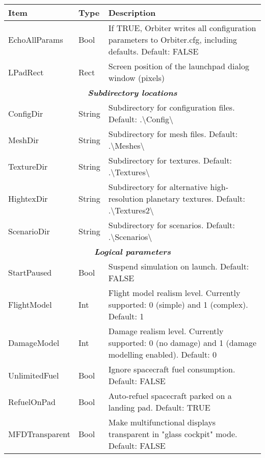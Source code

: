 \documentclass[Orbiter Developer Manual.tex]{subfiles}
\begin{document}
	\begin{longtable}{ |p{}|p{}|p{}| }
	\hline\rule{0pt}{2ex}
	\textbf{Item} & \textbf{Type} & \textbf{Description}\\
	\hline\rule{0pt}{2ex}
	EchoAllParams & Bool & If TRUE, Orbiter writes all configuration parameters to Orbiter.cfg, including defaults. Default: FALSE\\
	\hline\rule{0pt}{2ex}
	LPadRect & Rect & Screen position of the launchpad dialog window (pixels)\\
	\hline
	\multicolumn{3}{|c|}{\rule{0pt}{2ex}\textbf{\textit{Subdirectory locations}}}\\
	\hline\rule{0pt}{2ex}
	ConfigDir & String & Subdirectory for configuration files. Default: .\textbackslash Config\textbackslash\\
	\hline\rule{0pt}{2ex}
	MeshDir & String & Subdirectory for mesh files. Default: .\textbackslash Meshes\textbackslash\\
	\hline\rule{0pt}{2ex}
	TextureDir & String & Subdirectory for textures. Default: .\textbackslash Textures\textbackslash\\
	\hline\rule{0pt}{2ex}
	HightexDir & String & Subdirectory for alternative high-resolution planetary textures. Default: .\textbackslash Textures2\textbackslash\\
	\hline\rule{0pt}{2ex}
	ScenarioDir & String & Subdirectory for scenarios. Default: .\textbackslash Scenarios\textbackslash\\
	\hline
	\multicolumn{3}{|c|}{\rule{0pt}{2ex}\textbf{\textit{Logical parameters}}}\\
	\hline\rule{0pt}{2ex}
	StartPaused & Bool & Suspend simulation on launch. Default: FALSE\\
	\hline\rule{0pt}{2ex}
	FlightModel & Int & Flight model realism level. Currently supported: 0 (simple) and 1 (complex). Default: 1\\
	\hline\rule{0pt}{2ex}
	DamageModel & Int & Damage realism level. Currently supported: 0 (no damage) and 1 (damage modelling enabled). Default: 0\\
	\hline\rule{0pt}{2ex}
	UnlimitedFuel & Bool & Ignore spacecraft fuel consumption. Default: FALSE\\
	\hline\rule{0pt}{2ex}
	RefuelOnPad & Bool & Auto-refuel spacecraft parked on a landing pad. Default: TRUE\\
	\hline\rule{0pt}{2ex}
	MFDTransparent & Bool & Make multifunctional displays transparent in "glass cockpit" mode. Default: FALSE\\

\end{longtable}
\end{document}
